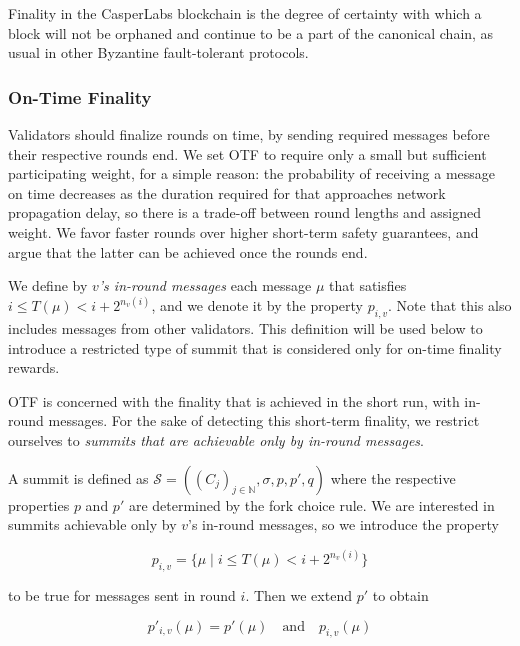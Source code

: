 Finality in the CasperLabs blockchain is the degree of certainty with which a block will not be orphaned and continue to be a part of the canonical chain, as usual in other Byzantine fault-tolerant protocols.

\subsubsection*{On-Time Finality}
\label{sec:on-time-finality}

Validators should finalize rounds on time, by sending required messages before their respective rounds end. We set OTF to require only a small but sufficient participating weight, for a simple reason: the probability of receiving a message on time decreases as the duration required for that approaches network propagation delay, so there is a trade-off between round lengths and assigned weight. We favor faster rounds over higher short-term safety guarantees, and argue that the latter can be achieved once the rounds end.


We define by \emph{$v$'s in-round messages} each message $\mu$ that satisfies $i \leq T(\mu)< i+2^{n_v(i)}$, and we denote it by the property $p_{i,v}$. Note that this also includes messages from other validators. This definition will be used below to introduce a restricted type of summit that is considered only for on-time finality rewards.



OTF is concerned with the finality that is achieved in the short run, with in-round messages. For the sake of detecting this short-term finality, we restrict ourselves to \emph{summits that are achievable only by in-round messages}.

A summit is defined as $\mathcal{S}=((C_j)_{j\in\mathbb{N}}, \sigma,p,p',q)$ where the respective properties $p$ and $p'$ are determined by the fork choice rule. We are interested in summits achievable only by $v$'s in-round messages, so we introduce the property

\begin{equation}
  p_{i,v} = \{\mu \mid i \leq T(\mu)< i+2^{n_v(i)}\}
\end{equation}

to be true for messages sent in round $i$. Then we extend $p'$ to obtain

\begin{equation}
  p'_{i,v}(\mu) = p'(\mu)\quad\text{and}\quad p_{i,v}(\mu)
\end{equation}

